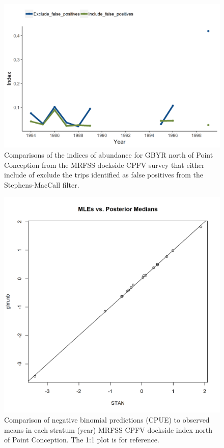 \documentclass[12pt,]{article}
\begin{document}
\begin{figure}
\centering
\includegraphics{Figures/MRFSS_index_N_SM_falsepos.png}
\caption{Comparisons of the indices of abundance for GBYR north of Point
Conception from the MRFSS dockside CPFV survey that either include of
exclude the trips identified as false positives from the
Stephens-MacCall filter. \label{fig:MRFSS_index_N_SM_falsepos}}
\end{figure}

\begin{figure}
\centering
\includegraphics{Figures/Fleet10_MLE_stan.png}
\caption{Comparison of negative binomial predictions (CPUE) to observed
means in each stratum (year) MRFSS CPFV dockside index north of Point
Conception. The 1:1 plot is for reference. \label{fig:Fleet10_MLE_stan}}
\end{figure}
\end{document}
